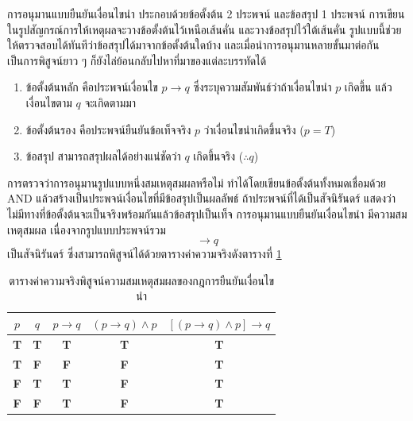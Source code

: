 การอนุมานแบบยืนยันเงื่อนไขนำ ประกอบด้วยข้อตั้งต้น 2 ประพจน์ และข้อสรุป 1 ประพจน์ การเขียนในรูปสัญกรณ์การให้เหตุผลจะวางข้อตั้งต้นไว้เหนือเส้นคั่น และวางข้อสรุปไว้ใต้เส้นคั่น รูปแบบนี้ช่วยให้ตรวจสอบได้ทันทีว่าข้อสรุปได้มาจากข้อตั้งต้นใดบ้าง และเมื่อนำการอนุมานหลายขั้นมาต่อกันเป็นการพิสูจน์ยาว ๆ ก็ยังไล่ย้อนกลับไปหาที่มาของแต่ละบรรทัดได้~\parencite{epp2019discrete}
\begin{enumerate}
    \item ข้อตั้งต้นหลัก คือประพจน์เงื่อนไข $p \rightarrow q$ ซึ่งระบุความสัมพันธ์ว่าถ้าเงื่อนไขนำ $p$ เกิดขึ้น แล้วเงื่อนไขตาม $q$ จะเกิดตามมา
    \item ข้อตั้งต้นรอง คือประพจน์ยืนยันข้อเท็จจริง $p$ ว่าเงื่อนไขนำเกิดขึ้นจริง ($p = T$)
    \item ข้อสรุป สามารถสรุปผลได้อย่างแน่ชัดว่า $q$ เกิดขึ้นจริง ($\therefore q$)
\end{enumerate}

การตรวจว่าการอนุมานรูปแบบหนึ่งสมเหตุสมผลหรือไม่ ทำได้โดยเขียนข้อตั้งต้นทั้งหมดเชื่อมด้วย AND แล้วสร้างเป็นประพจน์เงื่อนไขที่มีข้อสรุปเป็นผลลัพธ์ ถ้าประพจน์ที่ได้เป็นสัจนิรันดร์ แสดงว่าไม่มีทางที่ข้อตั้งต้นจะเป็นจริงพร้อมกันแล้วข้อสรุปเป็นเท็จ การอนุมานแบบยืนยันเงื่อนไขนำ มีความสมเหตุสมผล เนื่องจากรูปแบบประพจน์รวม~\parencite{copi2014logic}
\begin{equation}
[(p \rightarrow q) \land p] \rightarrow q
\end{equation}
เป็นสัจนิรันดร์ ซึ่งสามารถพิสูจน์ได้ด้วยตารางค่าความจริงดังตารางที่ \ref{tab:modus-ponens-valid}

\begin{table}[H]
    \centering
    \caption{ตารางค่าความจริงพิสูจน์ความสมเหตุสมผลของกฎการยืนยันเงื่อนไขนำ}
    \label{tab:modus-ponens-valid}
    \begin{tabular}{|c|c|c|c|c|}
        \hline
        $p$ & $q$ & $p \rightarrow q$ & $(p \rightarrow q) \land p$ & $[(p \rightarrow q) \land p] \rightarrow q$ \\ \hline
        \textbf{T} & \textbf{T} & \textbf{T} & \textbf{T} & \textbf{T} \\ \hline
        \textbf{T} & \textbf{F} & \textbf{F} & \textbf{F} & \textbf{T} \\ \hline
        \textbf{F} & \textbf{T} & \textbf{T} & \textbf{F} & \textbf{T} \\ \hline
        \textbf{F} & \textbf{F} & \textbf{T} & \textbf{F} & \textbf{T} \\ \hline
    \end{tabular}
\end{table}


